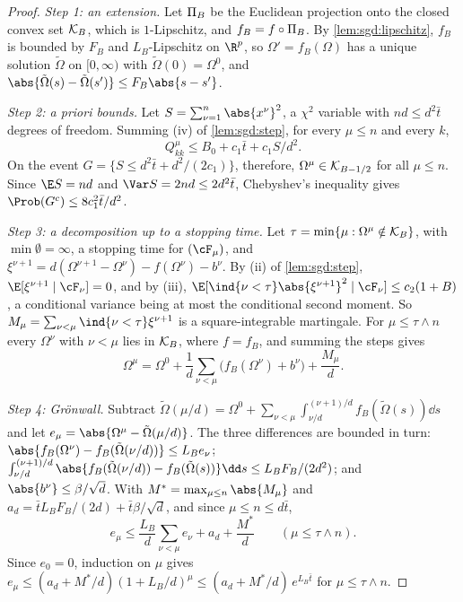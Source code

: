 \begin{refsection}
\begin{proof}
\emph{Step 1: an extension.} Let $\Pi_B$ be the Euclidean projection onto the closed convex set $\mathcal K_B$, which is $1$-Lipschitz, and $f_B=f\circ\Pi_B$. By \cref{lem:sgd:lipschitz}, $f_B$ is bounded by $F_B$ and $L_B$-Lipschitz on $\R^p$, so $\Omega'=f_B(\Omega)$ has a unique solution $\tilde\Omega$ on $[0,\infty)$ with $\tilde\Omega(0)=\Omega^0$, and $\abs{\tilde\Omega(s)-\tilde\Omega(s')}\le F_B\abs{s-s'}$.

\emph{Step 2: a priori bounds.} Let $S=\sum_{\nu=1}^n\abs{x^\nu}^2$, a $\chi^2$ variable with $nd\le d^2\bar t$ degrees of freedom. Summing (iv) of \cref{lem:sgd:step}, for every $\mu\le n$ and every $k$,
\begin{equation}\label{eq:sgd:apriori}
Q^\mu_{kk}\le B_0+c_1\bar t+c_1S/d^2.
\end{equation}
On the event $G=\{S\le d^2\bar t+d^2/(2c_1)\}$, therefore, $\Omega^\mu\in\mathcal K_{B-1/2}$ for all $\mu\le n$. Since $\E S=nd$ and $\Var S=2nd\le2d^2\bar t$, Chebyshev's inequality gives $\Prob(G^c)\le8c_1^2\bar t/d^2$.

\emph{Step 3: a decomposition up to a stopping time.} Let $\tau=\min\{\mu:\Omega^\mu\notin\mathcal K_B\}$, with $\min\emptyset=\infty$, a stopping time for $(\cF_\mu)$, and $\xi^{\nu+1}=d(\Omega^{\nu+1}-\Omega^\nu)-f(\Omega^\nu)-b^\nu$. By (ii) of \cref{lem:sgd:step}, $\E[\xi^{\nu+1}\mid\cF_\nu]=0$, and by (iii), $\E[\ind\{\nu<\tau\}\abs{\xi^{\nu+1}}^2\mid\cF_\nu]\le c_2(1+B)$, a conditional variance being at most the conditional second moment. So $M_\mu=\sum_{\nu<\mu}\ind\{\nu<\tau\}\xi^{\nu+1}$ is a square-integrable martingale. For $\mu\le\tau\wedge n$ every $\Omega^\nu$ with $\nu<\mu$ lies in $\mathcal K_B$, where $f=f_B$, and summing the steps gives
\[
\Omega^\mu=\Omega^0+\frac1d\sum_{\nu<\mu}\bigl(f_B(\Omega^\nu)+b^\nu\bigr)+\frac{M_\mu}d.
\]

\emph{Step 4: Grönwall.} Subtract $\tilde\Omega(\mu/d)=\Omega^0+\sum_{\nu<\mu}\int_{\nu/d}^{(\nu+1)/d}f_B(\tilde\Omega(s))\dd s$ and let $e_\mu=\abs{\Omega^\mu-\tilde\Omega(\mu/d)}$. The three differences are bounded in turn: $\abs{f_B(\Omega^\nu)-f_B(\tilde\Omega(\nu/d))}\le L_Be_\nu$; $\int_{\nu/d}^{(\nu+1)/d}\abs{f_B(\tilde\Omega(\nu/d))-f_B(\tilde\Omega(s))}\dd s\le L_BF_B/(2d^2)$; and $\abs{b^\nu}\le\beta/\sqrt d$. With $M^*=\max_{\mu\le n}\abs{M_\mu}$ and $a_d=\bar tL_BF_B/(2d)+\bar t\beta/\sqrt d$, and since $\mu\le n\le d\bar t$,
\[
e_\mu\le\frac{L_B}d\sum_{\nu<\mu}e_\nu+a_d+\frac{M^*}d\qquad(\mu\le\tau\wedge n).
\]
Since $e_0=0$, induction on $\mu$ gives $e_\mu\le(a_d+M^*/d)(1+L_B/d)^\mu\le(a_d+M^*/d)\,e^{L_B\bar t}$ for $\mu\le\tau\wedge n$.


\end{proof}
\end{refsection}
